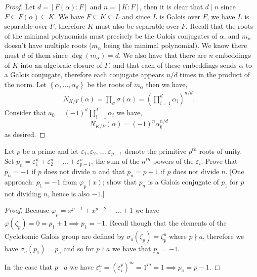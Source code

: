 \documentclass[11pt]{article}
\newenvironment{problem}[2][Problem\!]{\begin{tcolorbox}\begin{trivlist}
\item[\hskip \labelsep {\bfseries #1}\hskip \labelsep {\bfseries #2}]}{\end{trivlist}\end{tcolorbox}}
\newcommand{\set}[1]{\left\{#1\right\}} %
\renewcommand{\epsilon}{\varepsilon}
\renewcommand{\phi}{\varphi}
\newcommand{\lrp}[1]{\left(#1\right)}
\begin{document}
\begin{proof}
    Let $d = [F(\alpha): F]$ and $n = [K:F]$, then it is clear that $d\mid n$ since $F\subseteq F(\alpha) \subseteq K$. We have $F\subseteq K \subseteq L$ and since $L$ is Galois over $F$, we have $L$ is separable over $F$, therefore $K$ must also be separable over $F$. Recall that the roots of the minimal polynomials must precisely be the Galois conjugates of $\alpha$, and $m_\alpha$ doesn't have multiple roots ($m_\alpha$ being the minimal polynomial). We know there must $d$ of them since $\deg(m_\alpha) = d$. We also have that there are $n$ embeddings of $K$ into an algebraic closure of $F$, and that each of these embeddings sends $\alpha$ to a Galois conjugate, therefore each conjugate appears $n/d$ times in the product of the norm. Let $\set{\alpha,\dots ,\alpha_d}$ be the roots of $m_\alpha$ then we have,
    \begin{align*}
        N_{K/F} (\alpha) = \prod_\sigma \sigma(\alpha) = \lrp{\prod_{i = 1}^{d}\alpha_i}^{n/d}.
    \end{align*} 
    Consider that $a_0 = (-1)^{d}\prod_{i = 1}^{d}\alpha_i$ we have,
    \[N_{K/F}(\alpha) = (-1)^{n}\alpha_0^{n/d}\]
    as desired. 

\end{proof}

\vspace*{15pt}

\begin{problem}{14.5.5}
    Let $p$ be a prime and let $\epsilon_1, \epsilon_2, \dots , \epsilon_{p-1}$ denote the primitive $p^{th}$ roots of unity. Set $p_n = \epsilon_1^{n} + \epsilon_2^{n} + \dots + \epsilon_{p-1}^{n}$, the sum of the $n^{th}$ powers of the $\epsilon_i$. Prove that $p_n = -1$ if $p$ does not divide $n$ and that $p_n = p-1$ if $p$ does not divide $n$. [One approach: $p_1 = -1$ from $\phi_{p}(x)$; show that $p_n$ is a Galois conjugate of $p_1$ for $p$ not dividing $n$, hence is also $-1$.]
\end{problem}
\begin{proof}
    Because $\phi_p = x^{p-1} + x^{p-2} + \dots + 1$ we have $\phi(\zeta_p) = 0 = p_1 + 1 \implies p_1 = -1$. Recall though that the elements of the Cyclotomic Galois group are defined by $\sigma_a(\zeta_p) = \zeta_p^{a}$ where $p \nmid a$, therefore we have $\sigma_a(p_1) = p_a$ and so for $p\nmid a$ we have that $p_a = -1$.

    In the case that $p\mid a$ we have $\epsilon_i^{a} = (\epsilon_i^{p})^{m} = 1^{m} = 1 \implies p_a = p-1$. 
\end{proof}
\end{document}
